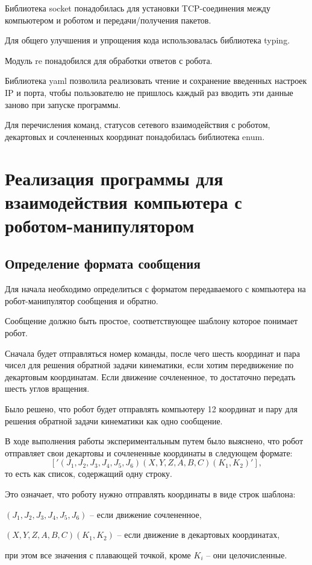 \documentclass[a4paper,14pt]{extarticle}
\begin{document}
Библиотека socket понадобилась для установки TCP-соединения между компьютером и роботом
и передачи/получения пакетов.


Для общего улучшения и упрощения кода использовалась
библиотека typing.


Модуль re понадобился для обработки ответов с робота.


Библиотека
yaml позволила реализовать чтение и сохранение введенных настроек IP и порта, чтобы
пользователю не пришлось каждый раз вводить эти данные заново при запуске программы.


Для перечисления команд, статусов сетевого взаимодействия с роботом,
декартовых и сочлененных координат понадобилась библиотека enum.


\section{Реализация программы для взаимодействия компьютера с роботом-манипулятором}
\subsection{Определение формата сообщения}
Для начала необходимо определиться
с форматом передаваемого с компьютера
на робот-манипулятор сообщения и обратно.


Сообщение должно быть простое, соответствующее
шаблону которое понимает робот.


Сначала будет отправляться номер команды, после чего
шесть координат и пара чисел для решения
обратной задачи кинематики, если хотим
передвижение по декартовым координатам.
Если движение сочлененное, то достаточно
передать шесть углов вращения.


Было решено, что робот будет отправлять компьютеру
12 координат и пару для решения обратной задачи кинематики
как одно сообщение.


В ходе выполнения работы экспериментальным путем было выяснено, что
робот отправляет свои декартовы и сочлененные координаты
в следующем формате:
$$
['(J_1,J_2,J_3,J_4,J_5,J_6)(X,Y,Z,A,B,C)(K_1,K_2)'],
$$
то есть как список, содержащий одну строку.


Это означает, что роботу нужно отправлять
координаты в виде строк шаблона:
\begin{compactitem}
    \item $(J_1,J_2,J_3,J_4,J_5,J_6)$ -- если движение сочлененное,
    \item $(X,Y,Z,A,B,C)(K_1,K_2)$ -- если движение в декартовых координатах,
\end{compactitem}
при этом все значения с плавающей точкой, кроме $K_i$ -- они целочисленные.
\end{document}
